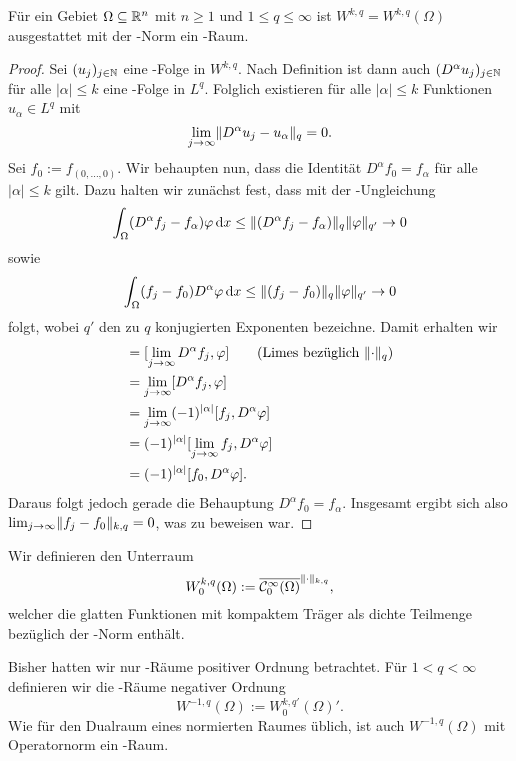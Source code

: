 \begin{lem}
  Für ein Gebiet $\Omega \subseteq \mathbb{R}^n$ mit $n \geq 1$ und $1 \leq q \leq \infty$ ist $W^{k,q} = W^{k,q}(\Omega)$ ausgestattet mit der \sobolev\hyp{}Norm ein \banach\hyp{}Raum.
\end{lem}

\begin{proof}
  Sei $(u_j)_{j \in \mathbb{N}}$ eine \cauchy\hyp{}Folge in $W^{k,q}$.
  Nach Definition ist dann auch $(D^\alpha u_j)_{j \in \mathbb{N}}$ für alle $|\alpha| \leq k$ eine \cauchy\hyp{}Folge in $L^q$.
  Folglich existieren für alle $|\alpha| \leq k$ Funktionen $u_\alpha \in L^q$ mit 
  $$
  \lim_{j \to \infty} \lVert D^\alpha u_j - u_\alpha \rVert_q = 0.
  $$
  Sei $f_0 := f_{(0,\dots,0)}$.
  Wir behaupten nun, dass die Identität $D^\alpha f_0 = f_\alpha$ für alle $|\alpha| \leq k$ gilt.
  Dazu halten wir zunächst fest, dass mit der \hoelder\hyp{}Ungleichung
  $$
  \int_\Omega (D^\alpha f_j - f_\alpha) \varphi \, {\operatorname{d}\!{x}}
  \leq \lVert (D^\alpha f_j - f_\alpha) \rVert_q \lVert \varphi \rVert_{q'} \to 0
  $$
  sowie
  $$
  \int_\Omega (f_j - f_0) D^\alpha \varphi \, {\operatorname{d}\!{x}}
  \leq \lVert (f_j - f_0) \rVert_q \lVert \varphi \rVert_{q'} \to 0
  $$
  folgt, wobei $q'$ den zu $q$ konjugierten Exponenten bezeichne.
  Damit erhalten wir
  \begin{align*}
    [f_\alpha, \varphi] 
    &= [\lim_{j \to \infty} D^\alpha f_j, \varphi] \tag{Limes bezüglich $\norm{\cdot}_q$} \\
    &= \lim_{j \to \infty} [D^\alpha f_j, \varphi] \\
    &= \lim_{j \to \infty} (-1)^{|\alpha|}[f_j, D^\alpha \varphi] \\
    &=  (-1)^{|\alpha|}[\lim_{j \to \infty} f_j, D^\alpha \varphi] \\
    &=  (-1)^{|\alpha|}[f_0, D^\alpha \varphi].
  \end{align*}
  Daraus folgt jedoch gerade die Behauptung $D^\alpha f_0 = f_\alpha$.
  Insgesamt ergibt sich also $\lim_{j \to \infty} \lVert f_j - f_0 \rVert_{k,q} =  0$, was zu beweisen war.
\end{proof}

Wir definieren den Unterraum
$$
  W_0^{k,q}(\Omega) := \overline{\mathcal{C}_0^\infty(\Omega)}^{\lVert \cdot \rVert_{k,q}},
$$
welcher die glatten Funktionen mit kompaktem Träger als dichte Teilmenge bezüglich der \sobolev\hyp{}Norm enthält.

Bisher hatten wir nur \sobolev\hyp{}Räume positiver Ordnung betrachtet.
Für $1 < q < \infty$ definieren wir die \sobolev\hyp{}Räume negativer Ordnung 
$$
  W^{-1,q}(\Omega) := W_0^{k,q'}(\Omega)'.
$$
Wie für den Dualraum eines normierten Raumes üblich, ist auch $W^{-1,q}(\Omega)$ mit Operatornorm ein \banach\hyp{}Raum.


